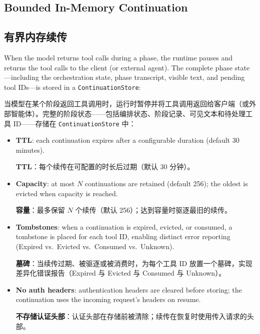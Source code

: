 \subsection{Bounded In-Memory Continuation}
\label{sec:continuation}
\begin{chinese}
\subsection{有界内存续传}
\end{chinese}

When the model returns tool calls during a phase, the runtime pauses and returns the tool calls to the client (or external agent). The complete phase state---including the orchestration state, phase transcript, visible text, and pending tool IDs---is stored in a \texttt{ContinuationStore}:
\begin{chinese}
当模型在某个阶段返回工具调用时，运行时暂停并将工具调用返回给客户端（或外部智能体）。完整的阶段状态——包括编排状态、阶段记录、可见文本和待处理工具 ID——存储在 \texttt{ContinuationStore} 中：
\end{chinese}

\begin{itemize}[nosep]
    \item \textbf{TTL}: each continuation expires after a configurable duration (default 30 minutes).
    \begin{chinese}
    \textbf{TTL}：每个续传在可配置的时长后过期（默认 30 分钟）。
    \end{chinese}
    \item \textbf{Capacity}: at most $N$ continuations are retained (default 256); the oldest is evicted when capacity is reached.
    \begin{chinese}
    \textbf{容量}：最多保留 $N$ 个续传（默认 256）；达到容量时驱逐最旧的续传。
    \end{chinese}
    \item \textbf{Tombstones}: when a continuation is expired, evicted, or consumed, a tombstone is placed for each tool ID, enabling distinct error reporting (Expired vs.\ Evicted vs.\ Consumed vs.\ Unknown).
    \begin{chinese}
    \textbf{墓碑}：当续传过期、被驱逐或被消费时，为每个工具 ID 放置一个墓碑，实现差异化错误报告（Expired 与 Evicted 与 Consumed 与 Unknown）。
    \end{chinese}
    \item \textbf{No auth headers}: authentication headers are cleared before storing; the continuation uses the incoming request's headers on resume.
    \begin{chinese}
    \textbf{不存储认证头部}：认证头部在存储前被清除；续传在恢复时使用传入请求的头部。
    \end{chinese}
\end{itemize}

